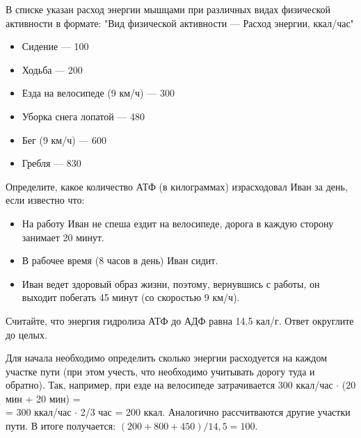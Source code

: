 
В списке указан расход энергии мышцами при различных
видах физической активности в формате: "Вид физической активности — Расход энергии, ккал/час"

\begin{itemize}
    \item Сидение — 100
    \item Ходьба — 200
    \item Езда на велосипеде (9 км/ч) — 300
    \item Уборка снега лопатой — 480
    \item Бег (9 км/ч) — 600
    \item Гребля — 830
\end{itemize}
 
Определите, какое количество АТФ
(в килограммах) израсходовал Иван за день, если известно что:

\begin{itemize}
    \item На работу Иван не спеша ездит на велосипеде, дорога в каждую сторону занимает 20 минут.
    \item В рабочее время (8 часов в день) Иван сидит.
    \item Иван ведет здоровый образ жизни, поэтому, вернувшись с работы, он выходит побегать 45 минут (со скоростью 9 км/ч).
\end{itemize}

Считайте, что энергия гидролиза
АТФ до АДФ равна 14.5 кал/г. Ответ округлите до целых.

\solutionSection

Для начала необходимо определить сколько энергии расходуется на каждом 
участке пути (при этом учесть, что необходимо учитывать дорогу туда и 
обратно). Так, например, при езде на велосипеде затрачивается 300 ккал/час 
$\cdot$ (20 мин + 20 мин) =\\ = 300 ккал/час $\cdot$ 2/3 час = 200 ккал. Аналогично рассчитваются другие участки пути. В итоге получается:
 $(200 + 800 + 450) / 14,5 = 100.$

